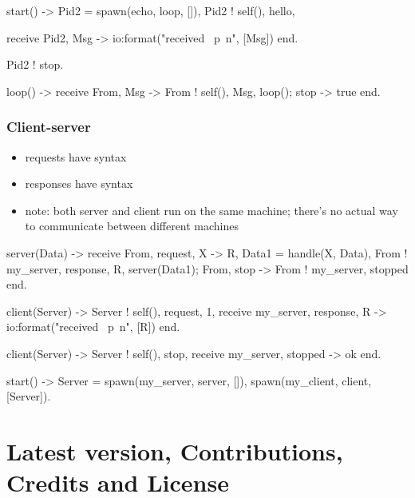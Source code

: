\documentclass[a4paper,landscape,10pt]{article}
\begin{document}
\begin{multicols*}{2}
\begin{erlang}
start() ->
  Pid2 = spawn(echo, loop, []),
  Pid2 ! {self(), hello},

  receive
    {Pid2, Msg} -> io:format("received ~p~n", [Msg])
  end.

Pid2 ! stop.

loop() ->
  receive
    {From, Msg} ->
      From ! {self(), Msg},
    loop();
    stop ->
      true
  end.
\end{erlang}

  \breakcolumn

  \subsubsection{Client-server}

  \begin{itemize}
    \item requests have syntax 
    \item responses have syntax 
    \item note: both server and client run on the same machine; there's no actual way to communicate between different machines
  \end{itemize}

  \begin{erlang}
server(Data) ->
  receive
    {From, {request, X}} ->
      {R, Data1} = handle(X, Data),
      From ! {my_server, {response, R}},
      server(Data1);
    {From, stop} ->
      From ! {my_server, stopped}
  end.

client(Server) ->
  Server ! {self(), {request, 1}},
  receive
    {my_server, {response, R}} ->
      io:format("received ~p~n", [R])
  end.

client(Server) ->
  Server ! {self(), stop},
  receive
    {my_server, stopped} ->
      ok
  end.

start() ->
  Server = spawn(my_server, server, []),
  spawn(my_client, client, [Server]).
\end{erlang}

\end{multicols*}

\clearpage

\section{Latest version, Contributions, Credits and License}
\end{document}
